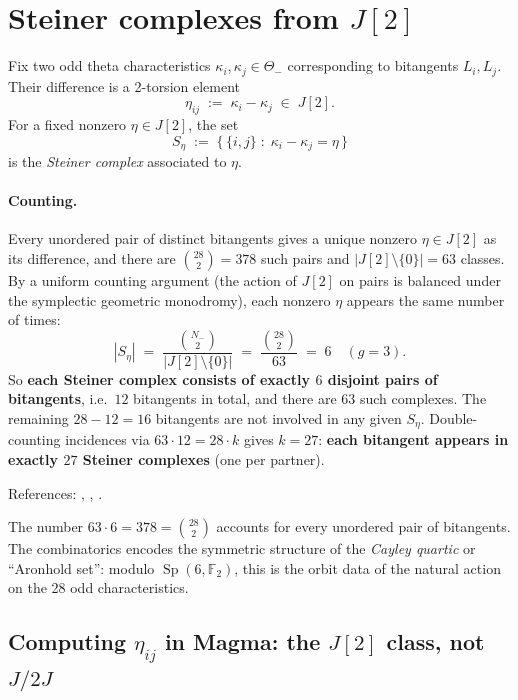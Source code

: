 \documentclass[11pt]{amsart}
\theoremstyle{plain}
\theoremstyle{definition}
\theoremstyle{remark}
\newcommand{\Sp}{\operatorname{Sp}}
\newcommand{\F}{\mathbb F}
\begin{document}
\section{Steiner complexes from $J[2]$}
\label{sec:steiner}

Fix two odd theta characteristics $\kappa_i, \kappa_j \in \Theta_-$
corresponding to bitangents $L_i, L_j$. Their difference is a 2-torsion
element
\[
  \eta_{ij} \;:=\; \kappa_i - \kappa_j \;\in\; J[2].
\]
For a fixed nonzero $\eta \in J[2]$, the set
\[
  S_\eta \;:=\; \bigl\{\, \{i,j\} \;:\; \kappa_i - \kappa_j = \eta \,\bigr\}
\]
is the \emph{Steiner complex} associated to $\eta$.

\paragraph{Counting.}
Every unordered pair of distinct bitangents gives a unique nonzero
$\eta \in J[2]$ as its difference, and there are $\binom{28}{2} = 378$ such
pairs and $|J[2] \setminus \{0\}| = 63$ classes. By a uniform counting
argument (the action of $J[2]$ on pairs is balanced under the symplectic
geometric monodromy), each nonzero $\eta$ appears the same number of times:
\[
  |S_\eta| \;=\; \frac{\binom{N_-}{2}}{|J[2] \setminus \{0\}|}
  \;=\; \frac{\binom{28}{2}}{63} \;=\; 6 \quad (g = 3).
\]
So \textbf{each Steiner complex consists of exactly $6$ disjoint pairs of
bitangents}, i.e.\ $12$ bitangents in total, and there are $63$ such
complexes. The remaining $28 - 12 = 16$ bitangents are not involved in any
given $S_\eta$. Double-counting incidences via $63 \cdot 12 = 28 \cdot k$
gives $k = 27$: \textbf{each bitangent appears in exactly $27$ Steiner
complexes} (one per partner).

References: \cite[\S 6.1.5]{Dolgachev2012}, \cite[\S 219]{Salmon1879},
\cite{DolgachevOrtland1988}.

The number $63 \cdot 6 = 378 = \binom{28}{2}$ accounts for every unordered
pair of bitangents. The combinatorics encodes the symmetric structure of
the \emph{Cayley quartic} or ``Aronhold set'': modulo $\Sp(6, \F_2)$, this
is the orbit data of the natural action on the 28 odd characteristics.

\subsection{Computing $\eta_{ij}$ in Magma: the $J[2]$ class, not $J/2J$}
\end{document}
